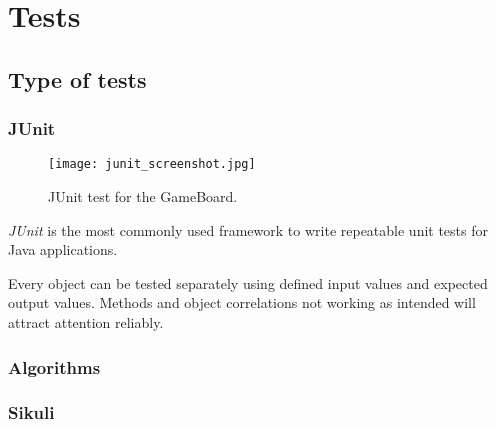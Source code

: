 \section{Tests}
\label{section:tests}

\subsection{Type of tests}

\subsubsection{JUnit}

\begin{figure}[h]
	\centering
	\texttt{[image: junit\_screenshot.jpg]}
	\caption{JUnit test for the GameBoard.}
	\label{img:screenJUnit}
\end{figure}
\emph{JUnit} is the most commonly used framework to write repeatable unit tests for Java applications.\par
Every object can be tested separately using defined input values and expected output values. Methods and object correlations not working as intended will attract attention reliably.\par

\subsubsection{Algorithms}


\subsubsection{Sikuli}

